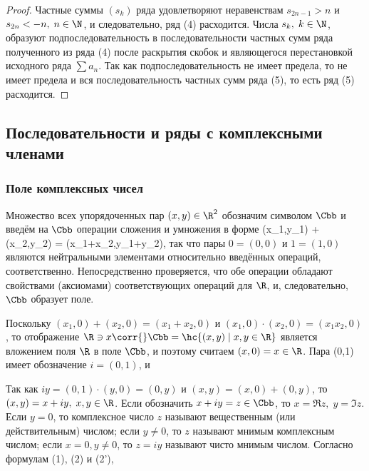 \documentclass[a4paper]{article}
\begin{document}
\begin{proof}
Частные суммы $(s_k)$ ряда 
удовлетворяют неравенствам $s_{2n-1}>n$ и $s_{2n}<-n, \; n\in\N$, и
следовательно, ряд (4) расходится. Числа $s_k, \; k\in\N$, образуют
подпоследовательность в последовательности частных сумм ряда
полученного из ряда (4) после раскрытия скобок и являющегося
перестановкой исходного ряда $\sum a_n$. Так как
подпоследовательность не имеет предела, то не имеет предела и вся
последовательность частных сумм ряда (5), то есть ряд (5)
расходится.
\end{proof}

\subsection{Последовательности и ряды с комплексными членами}

\subsubsection{Поле комплексных чисел}

Множество всех упорядоченных пар $(x,y)\in\R^2$ обозначим символом
$\Cbb$ и введём на $\Cbb$ операции сложения и умножения в форме
 { (x_1,y_1) + (x_2,y_2) = (x_1+x_2,y_1+y_2),}
 так что пары $0=(0,0)$ и $1=(1,0)$ являются нейтральными
элементами относительно введённых операций, соответственно.
Непосредственно проверяется, что обе операции обладают свойствами
(аксиомами) соответствующих операций для $\R$, и, следовательно,
$\Cbb$ образует поле.

Поскольку $(x_1,0)+(x_2,0) = (x_1+x_2,0)$ и $(x_1,0)\cdot(x_2,0) =
(x_1x_2,0)$, то отображение $\R\owns x \corr{} \Cbb = \hc{(x,y) \; |
\; x,y\in\R}$ является вложением поля $\R$ в поле $\Cbb$, и поэтому
считаем $(x,0)=x\in\R$. Пара (0,1) имеет обозначение $i=(0,1)$, и

Так как $iy=(0,1)\cdot(y,0)=(0,y)$ и $(x,y)=(x,0)+(0,y)$, то
$(x,y)=x + iy, \; x,y\in\R$. Если обозначить $x+iy=z\in\Cbb$, то
$x=\Re z, \; y=\Im z$. Если $y=0$, то комплексное число $z$ называют
вещественным (или действительным) числом; если $y\ne0$, то $z$
называют мнимым комплексным числом; если $x=0, y\ne0$, то $z=iy$
называют чисто мнимым числом. Согласно формулам (1), (2) и (2'),
\end{document}
